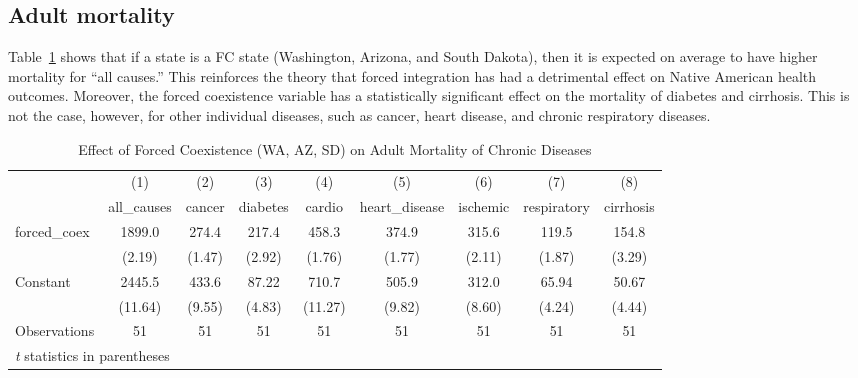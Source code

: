 \documentclass[12pt]{article}
\begin{document}
\subsection{Adult mortality}
Table~\ref{fc1} shows that if a state is a FC state (Washington, Arizona, and South Dakota), then it is expected on average to have higher mortality for ``all causes.'' 
This reinforces the theory that forced integration has had a detrimental effect on Native American health outcomes. 
Moreover, the forced coexistence variable has a statistically significant effect on the mortality of diabetes and cirrhosis.
This is not the case, however, for other individual diseases, such as cancer, heart disease, and chronic respiratory diseases.

\begin{table}[htbp]\centering \caption{Effect of Forced Coexistence (WA, AZ, SD) on Adult Mortality of Chronic Diseases\label{fc1}} \begin{tabular}{l*{8}{c}} \toprule
                    &\multicolumn{1}{c}{(1)}&\multicolumn{1}{c}{(2)}&\multicolumn{1}{c}{(3)}&\multicolumn{1}{c}{(4)}&\multicolumn{1}{c}{(5)}&\multicolumn{1}{c}{(6)}&\multicolumn{1}{c}{(7)}&\multicolumn{1}{c}{(8)}\\
                    &\multicolumn{1}{c}{all\_causes}&\multicolumn{1}{c}{cancer}&\multicolumn{1}{c}{diabetes}&\multicolumn{1}{c}{cardio}&\multicolumn{1}{c}{heart\_disease}&\multicolumn{1}{c}{ischemic}&\multicolumn{1}{c}{respiratory}&\multicolumn{1}{c}{cirrhosis}\\
\midrule
forced\_coex         &      1899.0&       274.4&       217.4&       458.3&       374.9&       315.6&       119.5&       154.8\\
                    &      (2.19)&      (1.47)&      (2.92)&      (1.76)&      (1.77)&      (2.11)&      (1.87)&      (3.29)\\
\addlinespace
Constant            &      2445.5&       433.6&       87.22&       710.7&       505.9&       312.0&       65.94&       50.67\\
                    &     (11.64)&      (9.55)&      (4.83)&     (11.27)&      (9.82)&      (8.60)&      (4.24)&      (4.44)\\
\midrule
Observations        &          51&          51&          51&          51&          51&          51&          51&          51\\
\bottomrule
\multicolumn{9}{l}{\footnotesize \textit{t} statistics in parentheses}\\
\end{tabular}
\end{table}
\end{document}
